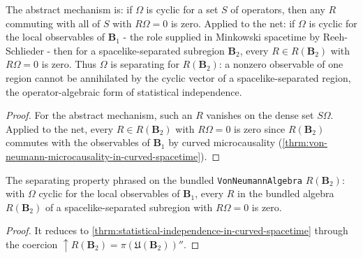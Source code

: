\begin{theorem}
    \label{thrm:statistical-independence-in-curved-spacetime}
    \leanok
    The abstract mechanism is: if $\Omega$ is cyclic for a set $S$ of operators, then any $R$ commuting with all of $S$ with $R\Omega = 0$ is zero. Applied to the net: if $\Omega$ is cyclic for the local observables of $\mathbf{B}_1$ - the role supplied in Minkowski spacetime by Reeh-Schlieder - then for a spacelike-separated subregion $\mathbf{B}_2$, every $R \in R(\mathbf{B}_2)$ with $R\Omega = 0$ is zero. Thus $\Omega$ is separating for $R(\mathbf{B}_2)$: a nonzero observable of one region cannot be annihilated by the cyclic vector of a spacelike-separated region, the operator-algebraic form of statistical independence.
\end{theorem}
\begin{proof}
    \leanok
    For the abstract mechanism, such an $R$ vanishes on the dense set $S\Omega$. Applied to the net, every $R \in R(\mathbf{B}_2)$ with $R\Omega = 0$ is zero since $R(\mathbf{B}_2)$ commutes with the observables of $\mathbf{B}_1$ by curved microcausality (\ref{thrm:von-neumann-microcausality-in-curved-spacetime}).
\end{proof}

\begin{theorem}
    \label{thrm:statistical-independence-bundled-in-curved-spacetime}
    \leanok
    The separating property phrased on the bundled \texttt{VonNeumannAlgebra} $R(\mathbf{B}_2)$: with $\Omega$ cyclic for the local observables of $\mathbf{B}_1$, every $R$ in the bundled algebra $R(\mathbf{B}_2)$ of a spacelike-separated subregion with $R\Omega = 0$ is zero.
\end{theorem}
\begin{proof}
    \leanok
    It reduces to \ref{thrm:statistical-independence-in-curved-spacetime} through the coercion $\uparrow R(\mathbf{B}_2) = \pi(\mathfrak{U}(\mathbf{B}_2))''$.
\end{proof}

